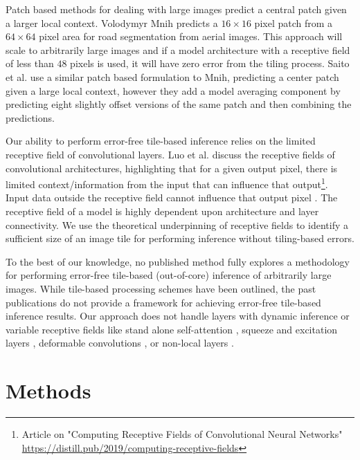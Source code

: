 \documentclass[10pt, indentfirst]{article}
\begin{document}
Patch based methods for dealing with large images predict a central patch given a larger local context. Volodymyr Mnih \citep{Mnih2013} predicts a $16 \times 16$ pixel patch from a $64 \times 64$ pixel area for road segmentation from aerial images. This approach will scale to arbitrarily large images and if a model architecture with a receptive field of less than $48$ pixels is used, it will have zero error from the tiling process. Saito et al. \citep{Saito2016} use a similar patch based formulation to Mnih, predicting a center patch given a large local context, however they add a model averaging component by predicting eight slightly offset versions of the same patch and then combining the predictions.

Our ability to perform error-free tile-based inference relies on the limited receptive field of convolutional layers. Luo et al. \citep{Luo2016} discuss the receptive fields of convolutional architectures, highlighting that for a given output pixel, there is limited context/information from the input that can influence that output\footnote{Article on "Computing Receptive Fields of Convolutional Neural Networks" \citep{araujo2019computing} \url{https://distill.pub/2019/computing-receptive-fields}}. Input data outside the receptive field cannot influence that output pixel \citep{Luo2016}. The receptive field of a model is highly dependent upon architecture and layer connectivity. We use the theoretical underpinning of receptive fields to identify a sufficient size of an image tile for performing inference without tiling-based errors.  

To the best of our knowledge, no published method fully explores a methodology for performing error-free tile-based (out-of-core) inference of arbitrarily large images. While tile-based processing schemes have been outlined, the past publications do not provide a framework for achieving error-free tile-based inference results. Our approach does not handle layers with dynamic inference or variable receptive fields like stand alone self-attention \citep{Ramachandran2019b}, squeeze and excitation layers \citep{Hu2018}, deformable convolutions \citep{Dai2017}, or non-local layers \citep{Wang2018c}. 


\section{Methods}
\label{methods}
\end{document}
